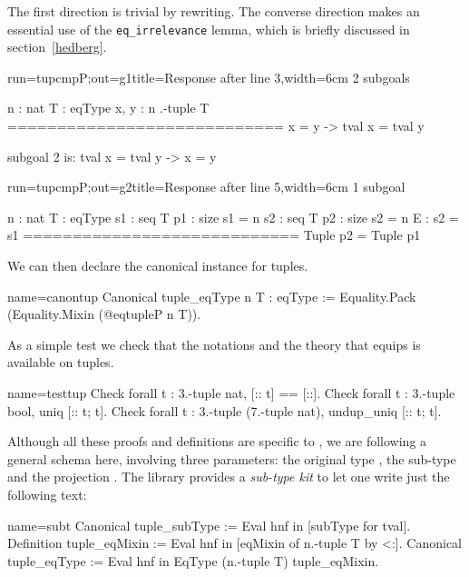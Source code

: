 The first direction is trivial by rewriting.
The converse direction makes an essential use of
the \lstinline/eq_irrelevance/ lemma, which is briefly discussed
in section~\ref{hedberg}.

\begin{coqout}{run=tupcmpP;out=g1}{title=Response after line 3,width=6cm}
2 subgoals

n : nat
T : eqType
x, y : n .-tuple T
============================
x = y -> tval x = tval y

subgoal 2 is:
  tval x = tval y -> x = y
$~$
\end{coqout}
\begin{coqout}{run=tupcmpP;out=g2}{title=Response after line 5,width=6cm}
1 subgoal

n : nat
T : eqType
s1 : seq T
p1 : size s1 = n
s2 : seq T
p2 : size s2 = n
E : s2 = s1
============================
Tuple p2 = Tuple p1
\end{coqout}

We can then declare the canonical  instance for tuples.

\begin{coq}{name=canontup}{}
Canonical tuple_eqType n T : eqType :=
  Equality.Pack (Equality.Mixin (@eqtupleP n T)).
\end{coq}

As a simple test we check that the notations and the theory
that equips  is available on tuples.

\begin{coq}{name=testtup}{}
Check forall t : 3.-tuple nat, [:: t] == [::].
Check forall t : 3.-tuple bool, uniq [:: t; t].
Check forall t : 3.-tuple (7.-tuple nat), undup_uniq [:: t; t].
\end{coq}

Although all these proofs and definitions are specific to ,
we are following a general schema here, involving
three parameters: the original type , the sub-type
 and the projection .
The \mcbMC{} library provides a \emph{sub-type kit} to let one
write just the following text:

\begin{coq}{name=subt}{}
Canonical tuple_subType := Eval hnf in [subType for tval].
Definition tuple_eqMixin := Eval hnf in [eqMixin of n.-tuple T by <:].
Canonical tuple_eqType := Eval hnf in EqType (n.-tuple T) tuple_eqMixin.
\end{coq}

